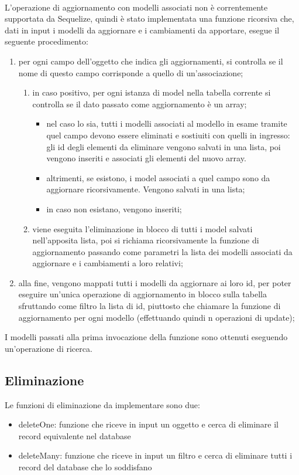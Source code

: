 \documentclass[a4paper, 12pt]{report}
\begin{document}
      \paragraph*{}
      L'operazione di aggiornamento con modelli associati non è correntemente supportata da Sequelize, quindi è stato implementata una funzione ricorsiva che, dati in input i modelli da aggiornare e i cambiamenti da apportare, esegue il seguente procedimento:
      \begin{enumerate}
        \item per ogni campo dell'oggetto che indica gli aggiornamenti, si controlla se il nome di questo campo corrisponde a quello di un'associazione;
        \begin{enumerate}
          \item in caso positivo, per ogni istanza di model nella tabella corrente si controlla se il dato passato come aggiornamento è un array;
          \begin{itemize}
            \item nel caso lo sia, tutti i modelli associati al modello in esame tramite quel campo devono essere eliminati e sostiuiti con quelli in ingresso: gli id degli elementi da eliminare vengono salvati in una lista, poi vengono inseriti e associati gli elementi del nuovo array.
            \item altrimenti, se esistono, i model associati a quel campo sono da aggiornare ricorsivamente. Vengono salvati in una lista;
            \item in caso non esistano, vengono inseriti;
          \end{itemize}
          \item viene eseguita l'eliminazione in blocco di tutti i model salvati nell'apposita lista, poi si richiama ricorsivamente la funzione di aggiornamento passando come parametri la lista dei modelli associati da aggiornare e i cambiamenti a loro relativi;
        \end{enumerate}
        \item alla fine, vengono mappati tutti i modelli da aggiornare ai loro id, per poter eseguire un'unica operazione di aggiornamento in blocco sulla tabella sfruttando come filtro la lista di id, piuttosto che chiamare la funzione di aggiornamento per ogni modello (effettuando quindi n operazioni di update);
      \end{enumerate}
      I modelli passati alla prima invocazione della funzione sono ottenuti eseguendo un'operazione di ricerca.
    \subsection{Eliminazione}
      Le funzioni di eliminazione da implementare sono due:
      \begin{itemize}
        \item deleteOne: funzione che riceve in input un oggetto e cerca di eliminare il record equivalente nel database
        \item deleteMany: funzione che riceve in input un filtro e cerca di eliminare tutti i record del database che lo soddisfano
      \end{itemize}
\end{document}
